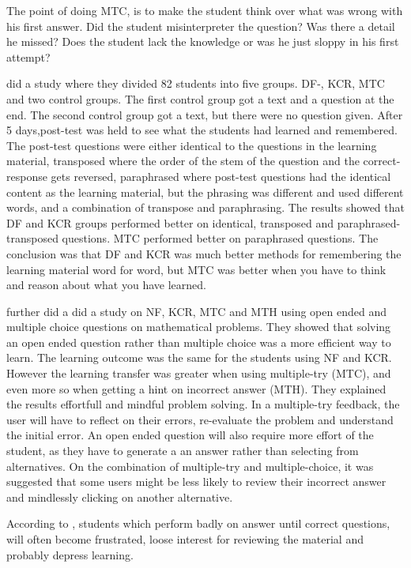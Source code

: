 The point of doing MTC, is to make the student think over what was wrong with his first answer. Did the student misinterpreter the question? Was there a detail he missed? Does the student lack the knowledge or was he just sloppy in his first attempt?

\textcite{Clariana2006} did a study where they divided 82 students into five groups. DF-, KCR, MTC and two control groups. The first control group got a text and a question at the end. The second control group got a text, but there were no question given. After 5 days,post-test was held to see what the students had learned and remembered. The post-test questions were either identical to the questions in the learning material, transposed where the order of the stem of the question and the correct-response gets reversed, paraphrased where post-test questions had the identical content as the learning material, but the phrasing was different and used different words, and a combination of transpose and paraphrasing. The results showed that DF and KCR groups performed better on identical, transposed and paraphrased-transposed questions. MTC performed better on paraphrased questions. The conclusion was that DF and KCR was much better methods for remembering the learning material word for word, but MTC was better when you have to think and reason about what you have learned.

\textcite{Attali2015} further did a did a study on NF, KCR, MTC and MTH using open ended and multiple choice questions on mathematical problems. They showed that solving an open ended question rather than multiple choice was a more efficient way to learn. The learning outcome was the same for the students using NF and KCR. However the learning transfer was greater when using multiple-try (MTC), and even more so when getting a hint on incorrect answer (MTH). They explained the results effortfull and mindful problem solving. In a multiple-try feedback, the user will have to reflect on their errors, re-evaluate the problem and understand the initial error. An open ended question will also require more effort of the student, as they have to generate a an answer rather than selecting from alternatives. On the combination of multiple-try and multiple-choice, it was suggested that some users might be less likely to review their incorrect answer and mindlessly clicking on another alternative. 



According to \textcite{Morrison1995}, students which perform badly on answer until correct questions,  will often become frustrated, loose interest for reviewing the material and probably depress learning.

